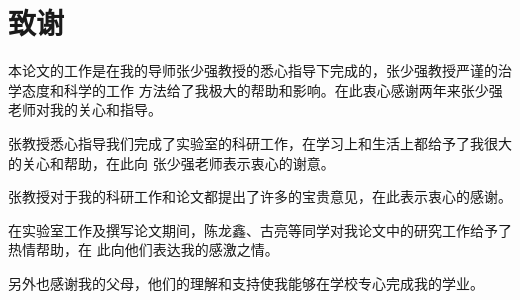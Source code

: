 
\chapter*{致\quad 谢}


\vspace*{1cm}
本论文的工作是在我的导师张少强教授的悉心指导下完成的，张少强教授严谨的治学态度和科学的工作
方法给了我极大的帮助和影响。在此衷心感谢两年来张少强老师对我的关心和指导。

张教授悉心指导我们完成了实验室的科研工作，在学习上和生活上都给予了我很大的关心和帮助，在此向
张少强老师表示衷心的谢意。

张教授对于我的科研工作和论文都提出了许多的宝贵意见，在此表示衷心的感谢。

在实验室工作及撰写论文期间，陈龙鑫、古亮等同学对我论文中的研究工作给予了热情帮助，在
此向他们表达我的感激之情。

另外也感谢我的父母，他们的理解和支持使我能够在学校专心完成我的学业。

